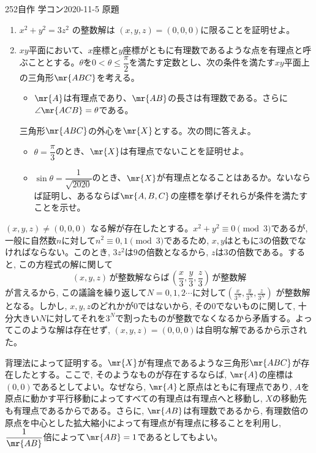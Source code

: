 \begin{prob}{252}{\maru}{自作 学コン2020-11-5 原題}
 \begin{enumerate}
  \item $x^2+y^2=3z^2$ の整数解は $(x,y,z)=(0,0,0)$に限ることを証明せよ。
  \item $xy$平面において、$x$座標と$y$座標がともに有理数であるような点を有理点と呼ぶこととする。$\theta$を$0<\theta\le\dfrac{\pi}{2}$を満たす定数とし、次の条件を満たす$xy$平面上の三角形$\mr{ABC}$を考える。
  \begin{itemize}
   \item[(条件)] $\mr{A}$は有理点であり、$\mr{AB}$の長さは有理数である。さらに$\angle\mr{ACB}=\theta$である。
  \end{itemize}
  三角形$\mr{ABC}$の外心を$\mr{X}$とする。次の問に答えよ。
  \begin{itemize}
   \item[(a)] $\theta=\dfrac{\pi}{3}$のとき、$\mr{X}$は有理点でないことを証明せよ。
   \item[(b)] $\sin\theta=\dfrac{1}{\sqrt{2020}}$のとき、$\mr{X}$が有理点となることはあるか。ないならば証明し、あるならば$\mr{A,B,C}$の座標を挙げそれらが条件を満たすことを示せ。 
  \end{itemize}
 \end{enumerate}
\end{prob}

$(x,y,z) \neq (0,0,0)$ なる解が存在したとする。$x^2 + y^2\equiv 0\pmod{3}$であるが, 一般に自然数$n$に対して$n^2\equiv 0,1\pmod{3}$であるため, $x,y$はともに$3$の倍数でなければならない。このとき, $3z^2$は$9$の倍数となるから, $z$は$3$の倍数である。すると, この方程式の解に関して
\[(x,y,z) \,\text{が整数解ならば} \,\left(\frac{x}{3}, \frac{y}{3}, \frac{z}{3}\right) \,\text{が整数解} \]
が言えるから, この議論を繰り返して$N=0,1,2\cdots$に対して$(\frac{x}{3^{N}}, \frac{y}{3^{N}}, \frac{z}{3^{N}})$ が整数解となる。しかし, $x,y,z$のどれかが$0$ではないから, その$0$でないものに関して, 十分大きい$N$に対してそれを$3^{N}$で割ったものが整数でなくなるから矛盾する。よってこのような解は存在せず, $(x,y,z) = (0,0,0)$は自明な解であるから示された。

背理法によって証明する。$\mr{X}$が有理点であるような三角形$\mr{ABC}$が存在したとする。ここで, そのようなものが存在するならば, $\mr{A}$の座標は$(0,0)$であるとしてよい。なぜなら, $\mr{A}$と原点はともに有理点であり, $A$を原点に動かす平行移動によってすべての有理点は有理点へと移動し, $X$の移動先も有理点であるからである。さらに, $\mr{AB}$は有理数であるから, 有理数倍の原点を中心とした拡大縮小によって有理点が有理点に移ることを利用し, $\dfrac{1}{\mr{AB}}$倍によって$\mr{AB}=1$であるとしてもよい。

